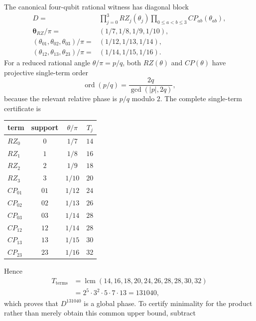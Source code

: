 The canonical four-qubit rational witness has diagonal block
\begin{equation*}
\begin{aligned}
D={}&\prod_{j=0}^{3}RZ_j(\theta_j)
 \prod_{0\leq a<b\leq3}CP_{ab}(\theta_{ab}),\\
\boldsymbol\theta_{RZ}/\pi
={}&(1/7,1/8,1/9,1/10),\\
(\theta_{01},\theta_{02},\theta_{03})/\pi
={}&(1/12,1/13,1/14),\\
(\theta_{12},\theta_{13},\theta_{23})/\pi
={}&(1/14,1/15,1/16).
\end{aligned}
\end{equation*}
For a reduced rational angle $\theta/\pi=p/q$, both $RZ(\theta)$ and
$CP(\theta)$ have projective single-term order
\begin{equation*}
 \operatorname{ord}(p/q)
 =\frac{2q}{\gcd(|p|,2q)},
\end{equation*}
because the relevant relative phase is $p/q$ modulo $2$.  The complete
single-term certificate is
\begin{center}
\begin{tabular}{lccc}
\toprule
term & support & $\theta/\pi$ & $T_j$\\
\midrule
$RZ_0$ & $0$ & $1/7$ & $14$\\
$RZ_1$ & $1$ & $1/8$ & $16$\\
$RZ_2$ & $2$ & $1/9$ & $18$\\
$RZ_3$ & $3$ & $1/10$ & $20$\\
$CP_{01}$ & $01$ & $1/12$ & $24$\\
$CP_{02}$ & $02$ & $1/13$ & $26$\\
$CP_{03}$ & $03$ & $1/14$ & $28$\\
$CP_{12}$ & $12$ & $1/14$ & $28$\\
$CP_{13}$ & $13$ & $1/15$ & $30$\\
$CP_{23}$ & $23$ & $1/16$ & $32$\\
\bottomrule
\end{tabular}
\end{center}
Hence
\begin{equation*}
\begin{aligned}
T_{\mathrm{terms}}
&=\operatorname{lcm}(14,16,18,20,24,26,28,28,30,32)\\
&=2^5\cdot3^2\cdot5\cdot7\cdot13=131040,
\end{aligned}
\end{equation*}
which proves that $D^{131040}$ is a global phase.  To certify minimality
for the product rather than merely obtain this common upper bound, subtract
